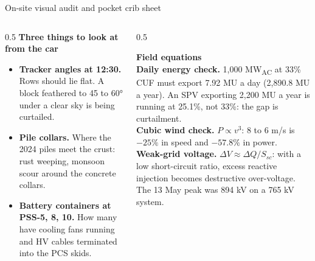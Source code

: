 \documentclass[aspectratio=169,10pt,t]{beamer}
\newcommand{\dia}[2]{\resizebox{!}{#2}{}}      %
\newenvironment{pts}{\begin{itemize}\footnotesize\setlength{\itemsep}{3pt}}{\end{itemize}}
\begin{document}
\begin{frame}{On-site visual audit and pocket crib sheet}
  \begin{columns}[T]
    \begin{column}{0.5\textwidth}
      {\footnotesize\textbf{Three things to look at from the car}}
      \begin{pts}
        \item \textbf{Tracker angles at 12:30.} Rows should lie flat. A block feathered to 45 to 60° under a clear sky is being curtailed.
        \item \textbf{Pile collars.} Where the 2024 piles meet the crust: rust weeping, monsoon scour around the concrete collars.
        \item \textbf{Battery containers at PSS-5, 8, 10.} How many have cooling fans running and HV cables terminated into the PCS skids.
      \end{pts}
      \centering\dia{d26_tracker_angles}{2.6cm}
    \end{column}
    \begin{column}{0.5\textwidth}
      \begin{tcolorbox}[colback=SpNearBlack,colframe=SpNearBlack,arc=3pt,left=3mm,right=3mm,top=2mm,bottom=2mm,coltext=white]
        {\footnotesize\textbf{\textcolor{SpOrange}{Field equations}}}\\[4pt]
        {\scriptsize
        \textbf{Daily energy check.} 1,000 MW\textsubscript{AC} at 33\% CUF must export 7.92 MU a day (2,890.8 MU a year). An SPV exporting 2,200 MU a year is running at \textcolor{SpOrange}{25.1\%}, not 33\%: the gap is curtailment.\\[5pt]
        \textbf{Cubic wind check.} $P \propto v^{3}$: 8 to 6 m/s is $-25\%$ in speed and \textcolor{SpOrange}{$-57.8\%$} in power.\\[5pt]
        \textbf{Weak-grid voltage.} $\Delta V \approx \Delta Q / S_{sc}$: with a low short-circuit ratio, excess reactive injection becomes destructive over-voltage. The 13 May peak was \textcolor{SpOrange}{894 kV} on a 765 kV system.}
      \end{tcolorbox}
    \end{column}
  \end{columns}
\end{frame}
\end{document}

